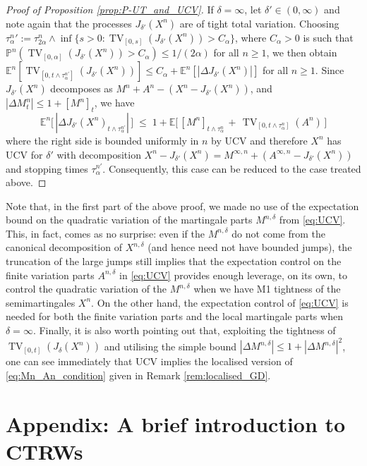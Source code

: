 \documentclass[11pt]{article}
\theoremstyle{definition}\newtheorem{example}[theorem]{Example}
\theoremstyle{definition}\newtheorem{counterexample}[theorem]{Counterexample}
\theoremstyle{definition}\newtheorem{remark}[theorem]{Remark}
\theoremstyle{definition}\newtheorem{defi}[theorem]{Definition}
\numberwithin{equation}{section}
\newcommand{\E}{\mathbb{E}}											%
\newcommand{\Pro}{\mathbb{P}}										%
\renewcommand{\|}{\; : \, \;}											%
\begin{document}
\begin{proof}[Proof of Proposition \ref{prop:P-UT_and_UCV}]
	If $\delta=\infty$, let $\delta' \in (0,\infty)$ and note again that the processes $J_{\delta'}(X^n)$ are of tight total variation. Choosing ${\tau^{n}_\alpha}':=\tau^n_{2\alpha} \wedge \operatorname{inf}\{s>0: \operatorname{TV}_{[0,s]}(J_{\delta'}(X^n)) > C_\alpha\}$, where $C_\alpha>0$ is such that $\Pro^n(\operatorname{TV}_{[0,\alpha]}(J_{\delta'}(X^n)) > C_\alpha)\le 1/(2\alpha)$ for all $n\ge 1$, we then obtain $\E^n[\operatorname{TV}_{[0,t\wedge \tau^{n'}_\alpha]}(J_{\delta'}(X^n))] \le C_\alpha + \E^n[|\Delta J_{\delta'}(X^n)|]$ for all $n\ge 1$. Since $J_{\delta'}(X^n)$ decomposes as $M^n+A^n-(X^n-J_{\delta'}(X^n))$, and $ |\Delta M^n_t| \leq 1+ [M^n]_t$, we have 
	\[
		\E^n\Big[\, |\Delta J_{\delta'}(X^n)_{t\wedge \tau^{n'}_\alpha}|\, \Big] \;\le \;1+ \E\Big[\, [M^n]_{t\wedge \tau^{n}_\alpha} \, + \, \operatorname{TV}_{[0,t\wedge \tau^{n}_\alpha]}(A^n)\, \Big]
	\]
	where the right side is bounded uniformly in $n$ by UCV and therefore $X^n$ has UCV for $\delta'$ with decomposition $X^n-J_{\delta'}(X^n)= M^{\infty,n} + (A^{\infty, n} - J_{\delta'}(X^n))$ and stopping times $\tau^{n'}_\alpha$. Consequently, this case can be reduced to the case treated above.
\end{proof}

Note that, in the first part of the above proof, we made no use of the expectation bound on the quadratic variation of the martingale parts $M^{n,\delta}$ from \eqref{eq:UCV}. This, in fact, comes as no surprise: even if the $M^{n,\delta}$ do not come from the canonical decomposition of $X^{n,\delta}$ (and hence need not have bounded jumps), the truncation of the large jumps still implies that the expectation control on the finite variation parts $A^{n,\delta}$ in \eqref{eq:UCV} provides enough leverage, on its own, to control the quadratic variation of the $M^{n,\delta}$ when we have M1 tightness of the semimartingales $X^n$. On the other hand, the expectation control of \eqref{eq:UCV} is needed for both the finite variation parts and the local martingale parts when $\delta=\infty$. Finally, it is also worth pointing out that, exploiting the tightness of $\operatorname{TV}_{[0,t]}(J_\delta(X^n))$ and utilising the simple bound $|\Delta M^{n,\delta}| \leq 1 + |\Delta M^{n,\delta}|^2$, one can see immediately that UCV implies the localised version of \eqref{eq:Mn_An_condition} given in Remark \ref{rem:localised_GD}.

\section{Appendix: A brief introduction to CTRWs}\label{subsect:CTRW}
\end{document}
